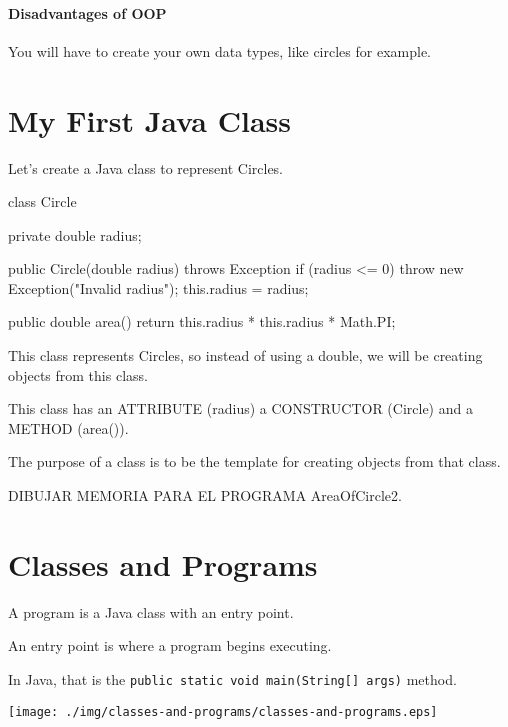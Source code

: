\documentclass[a4paper, 9pt]{extarticle}
\begin{document}
\paragraph{Disadvantages of OOP}

You will have to create your own data types, like circles for example.









\newpage
\section{My First Java Class}

Let's create a Java class to represent Circles.

\begin{blackboard}
class Circle {
  private double radius;

  public Circle(double radius) throws Exception {
    if (radius <= 0) {
      throw new Exception("Invalid radius");
    }
    this.radius = radius;
  }

  public double area() {
    return this.radius * this.radius * Math.PI;
  }
}
\end{blackboard}

This class represents Circles, so instead of using a double, we will be
creating objects from this class.

This class has an ATTRIBUTE (radius) a CONSTRUCTOR (Circle) and a METHOD (area()).

The purpose of a class is to be the template for creating objects from that
class.

DIBUJAR MEMORIA PARA EL PROGRAMA AreaOfCircle2.







\section{Classes and Programs}

A program is a Java class with an entry point.

An entry point is where a program begins executing.

In Java, that is the \verb+public static void main(String[] args)+ method.

\begin{center}
  \texttt{[image: ./img/classes-and-programs/classes-and-programs.eps]}
\end{center}
\end{document}

